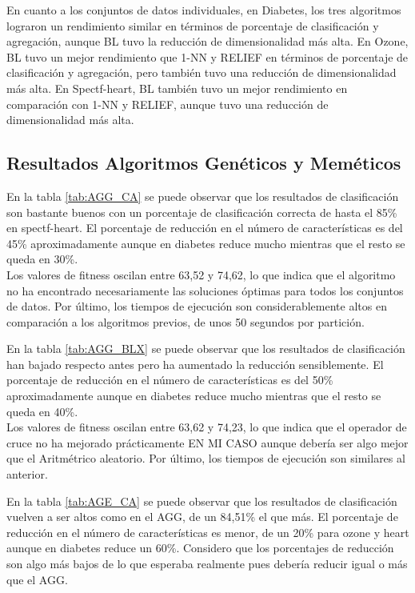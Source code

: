 En cuanto a los conjuntos de datos individuales, en Diabetes, los tres algoritmos lograron un rendimiento similar en términos de porcentaje de clasificación y agregación, aunque BL tuvo la reducción de dimensionalidad más alta. En Ozone, BL tuvo un mejor rendimiento que 1-NN y RELIEF en términos de porcentaje de clasificación y agregación, pero también tuvo una reducción de dimensionalidad más alta. En Spectf-heart, BL también tuvo un mejor rendimiento en comparación con 1-NN y RELIEF, aunque tuvo una reducción de dimensionalidad más alta.\\

\subsection{Resultados Algoritmos Genéticos y Meméticos}


En la tabla \ref{tab:AGG_CA} se puede observar que los resultados de clasificación son bastante buenos con un porcentaje de clasificación correcta de hasta el 85\% en spectf-heart. El porcentaje de reducción en el número de características es del 45\% aproximadamente aunque en diabetes reduce mucho mientras que el resto se queda en 30\%.\\

Los valores de fitness oscilan entre 63,52 y 74,62, lo que indica que el algoritmo no ha encontrado necesariamente las soluciones óptimas para todos los conjuntos de datos. Por último, los tiempos de ejecución son considerablemente altos en comparación a los algoritmos previos, de unos 50 segundos por partición.


En la tabla \ref{tab:AGG_BLX} se puede observar que los resultados de clasificación han bajado respecto antes pero ha aumentado la reducción sensiblemente. El porcentaje de reducción en el número de características es del 50\% aproximadamente aunque en diabetes reduce mucho mientras que el resto se queda en 40\%.\\

Los valores de fitness oscilan entre 63,62 y 74,23, lo que indica que el operador de cruce no ha mejorado prácticamente EN MI CASO aunque debería ser algo mejor que el Aritmétrico aleatorio. Por último, los tiempos de ejecución son similares al anterior.


En la tabla \ref{tab:AGE_CA} se puede observar que los resultados de clasificación vuelven a ser altos como en el AGG, de un 84,51\% el que más. El porcentaje de reducción en el número de características es menor, de un 20\% para ozone y heart aunque en diabetes reduce un 60\%. Considero que los porcentajes de reducción son algo más bajos de lo que esperaba realmente pues debería reducir igual o más que el AGG.

